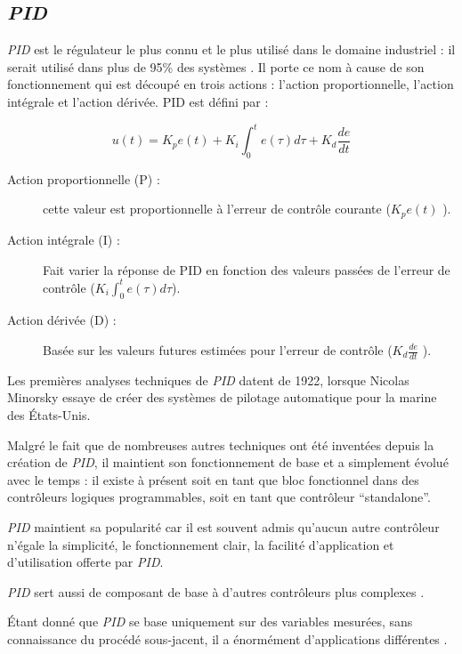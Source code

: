 \documentclass[a4paper,10pt]{report}
\begin{document}
\subsection{\emph{PID}}
\label{PID}

\emph{PID} est le régulateur le plus connu et le plus utilisé dans le domaine industriel : il serait utilisé dans plus de 95\% des systèmes \cite{Kinnaert2013, aastrom2002control}.
Il porte ce nom à cause de son fonctionnement qui est découpé en trois actions : l'action proportionnelle, l'action intégrale et l'action dérivée. PID est défini par :

\begin{equation}
  u(t) = K_p e(t) + K_i \int_{0}^{t} e(\tau) d\tau + K_d \frac{de}{dt}
\end{equation}
\begin{description} %
\item[Action proportionnelle (P) :]
    cette valeur est proportionnelle à l'erreur de contrôle courante ($K_p e(t)$ ).
\item[Action intégrale (I) :]
    Fait varier la réponse de PID en fonction des valeurs passées de l'erreur de contrôle ($K_i \int_{0}^{t} e(\tau) d\tau$).
\item[Action dérivée (D) :]
    Basée sur les valeurs futures estimées pour l'erreur de contrôle ($K_d \frac{de}{dt}$ ).
\end{description}

Les premières analyses techniques de \emph{PID} datent de 1922, lorsque Nicolas Minorsky essaye de créer des systèmes de pilotage automatique pour la marine des États-Unis. \cite{minorsky1922directional}

Malgré le fait que de nombreuses autres techniques ont été inventées depuis la création de \emph{PID}, il maintient son fonctionnement de base et a simplement évolué avec le temps :
il existe à présent soit en tant que bloc fonctionnel dans des contrôleurs logiques programmables, soit en tant que contrôleur ``standalone''.

\emph{PID} maintient sa popularité car il est souvent admis qu'aucun autre contrôleur n'égale la simplicité, le fonctionnement clair, la facilité d'application et d'utilisation offerte par \emph{PID}. %

\emph{PID} sert aussi de composant de base à d'autres contrôleurs plus complexes \cite{ang2005pid} \cite{visioli2006practical}. %

Étant donné que \emph{PID} se base uniquement sur des variables mesurées, sans connaissance du procédé sous-jacent, il a énormément d'applications différentes \cite{bennett1993history}.
\end{document}

